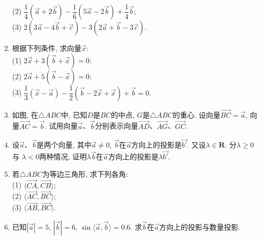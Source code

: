 \documentclass[10pt,a4paper]{article}
\begin{document}
\begin{enumerate}[1.]
(2) $\dfrac 14(\overrightarrow a+2\overrightarrow b)-\dfrac 16(5\overrightarrow a-2\overrightarrow b)+\dfrac 14\overrightarrow b$;\\
(3) $2(3\overrightarrow a-4\overrightarrow b+\overrightarrow c)-3(2\overrightarrow a+\overrightarrow b-3\overrightarrow c)$.
\item 根据下列条件, 求向量$\overrightarrow x$:\\
(1) $2\overrightarrow x+3(\overrightarrow b+\overrightarrow x)=0$;\\
(2) $2\overrightarrow a+5(\overrightarrow b-\overrightarrow x)=0$;\\
(3) $\dfrac 13(\overrightarrow x-\overrightarrow a)-\dfrac 12(\overrightarrow b-2\overrightarrow x+\overrightarrow x)+\overrightarrow b=0$.
\item 如图, 在$\triangle ABC$中, 已知$D$是$BC$的中点, $G$是$\triangle ABC$的重心. 设向量$\overrightarrow{BC}=\overrightarrow a$, 向量$\overrightarrow{AC}=\overrightarrow b$. 试用向量$\overrightarrow a$、$\overrightarrow b$分别表示向量$\overrightarrow{AD}$、$\overrightarrow{AG}$、$\overrightarrow{GC}$.
\begin{center}
\end{center}
\item 设$\overrightarrow a$、$\overrightarrow b$是两个向量, 其中$\overrightarrow a\ne 0$, $\overrightarrow b$在$\overrightarrow a$方向上的投影是$\overrightarrow {b'}$. 又设$\lambda \in \mathbf{R}$. 分$\lambda \ge 0$与
$\lambda  <0$两种情况, 证明$\lambda \overrightarrow b$在$\overrightarrow a$方向上的投影是$\lambda  \overrightarrow {b'}$.
\item 若$\triangle ABC$为等边三角形, 求下列各角:\\
(1) $\langle \overrightarrow{CA}, \overrightarrow{CB}\rangle$;\\
(2) $\langle \overrightarrow{AC}, \overrightarrow{BC}\rangle$;\\
(3) $\langle \overrightarrow{AB}, \overrightarrow{BC}\rangle$.
\item 已知$|\overrightarrow a|=5$, $|\overrightarrow b|=6$, $\sin \langle \overrightarrow a, \overrightarrow b\rangle =0.6$. 求$\overrightarrow b$在$\overrightarrow a$方向上的投影与数量投影. 

\end{enumerate}
\end{document}
